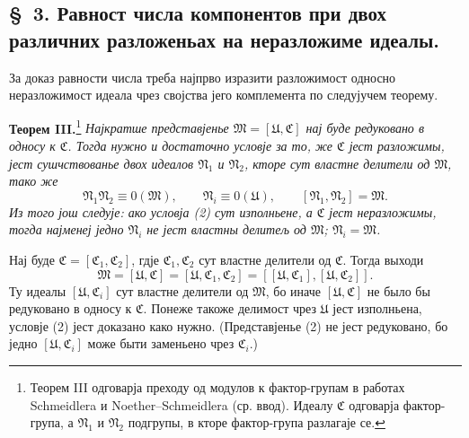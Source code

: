 ﻿\documentclass[11pt]{article}
\newcommand{\ideal}[1]{\mathfrak{#1}}
\begin{document}

\setcounter{footnote}{12}
\subsection*{\S~3. Равност числа компонентов при двох различних разложеньах на неразложиме идеалы.}

За доказ равности числа треба најпрво изразити разложимост односно неразложимост идеала чрез својства јего комплемента по следујучем теорему.

\textbf{Теорем III.}\footnote{Теорем III одговарја преходу од модулов к фактор-групам в работах Schmeidlera и Noether--Schmeidlera (ср. ввод). Идеалу \(\ideal C\) одговарја фактор-група, а \(\ideal N_1\) и \(\ideal N_2\) подгрупы, в кторе фактор-група разлагаје се.} \emph{Најкратше представјенье \(\ideal M=[\ideal U,\ideal C]\) нај буде редуковано в односу к \(\ideal C\). Тогда нужно и достаточно условје за то, же \(\ideal C\) јест разложимы, јест сушчствованье двох идеалов \(\ideal N_1\) и \(\ideal N_2\), кторе сут властне делители од \(\ideal M\), тако же}
\begin{equation}
 \ideal N_1\ideal N_2\equiv0(\ideal M),\qquad
 \ideal N_i\equiv0(\ideal U),\qquad
 [\ideal N_1,\ideal N_2]=\ideal M.
\tag{2}
\end{equation}
\emph{Из того још следује: ако условја (2) сут изполньене, а \(\ideal C\) јест неразложимы, тогда најменеј једно \(\ideal N_i\) не јест властны делитељ од \(\ideal M\); \(\ideal N_i=\ideal M\).}

Нај буде \(\ideal C=[\ideal C_1,\ideal C_2]\), гдје \(\ideal C_1,\ideal C_2\) сут властне делители од \(\ideal C\). Тогда выходи
\[
 \ideal M=[\ideal U,\ideal C]=[\ideal U,\ideal C_1,\ideal C_2]
       =[[\ideal U,\ideal C_1],[\ideal U,\ideal C_2]].
\]
Ту идеалы \([\ideal U,\ideal C_i]\) сут властне делители од \(\ideal M\), бо иначе \([\ideal U,\ideal C]\) не было бы редуковано в односу к \(\ideal C\). Понеже такоже делимост чрез \(\ideal U\) јест изполньена, условје (2) јест доказано како нужно. (Представјенье (2) не јест редуковано, бо једно \([\ideal U,\ideal C_i]\) може быти заменьено чрез \(\ideal C_i\).)
\end{document}

